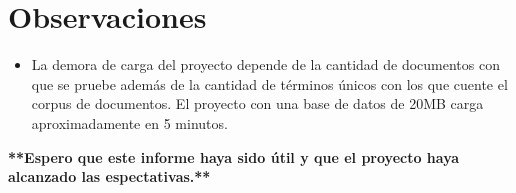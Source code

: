 \documentclass{article}
\begin{document}
\section{Observaciones}
\begin{itemize}
  \item La demora de carga del proyecto depende de la cantidad de documentos con que se pruebe además de la cantidad
  de términos únicos con los que cuente el corpus de documentos. El proyecto con una base de datos de 20MB carga aproximadamente en 
  5 minutos.
\end{itemize}

\textbf{**Espero que este informe haya sido útil y que el proyecto haya alcanzado las espectativas.**}
\end{document}
